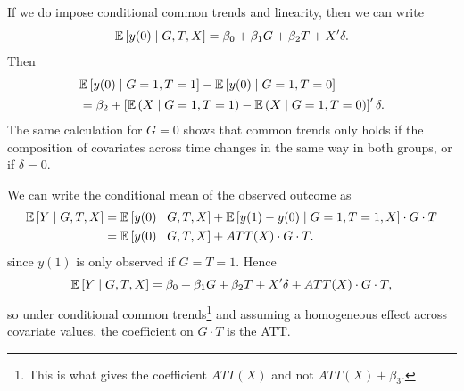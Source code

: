 \begin{remark}
	If we do impose conditional common trends and linearity, then we can write
	\[
		\mathbb{E}\left[y(0) \mid G, T, X\right] = \beta_0 + \beta_1 G + \beta_2 T + X'\delta
	.\]
	Then
	\begin{align*}
		& \mathbb{E}\left[y(0) \mid G=1, T=1\right] - \mathbb{E}\left[y(0) \mid G=1, T=0\right]\\
		&= \beta_2 + \left[\mathbb{E}\left(X \mid G=1, T=1\right) - \mathbb{E}\left(X \mid G=1, T=0\right)\right]'\delta
	.\end{align*}
	The same calculation for $G=0$ shows that common trends only holds if the composition of covariates across time changes in the same way in both groups, or if $\delta=0$.

\end{remark}

We can write the conditional mean of the observed outcome as 
\begin{align*}
	\mathbb{E}\left[Y \mid G, T, X\right]
	&= \mathbb{E}\left[y(0) \mid G, T, X\right] + \mathbb{E}\left[y(1)-y(0) \mid G=1, T=1, X\right]\cdot G \cdot T \\
	&= \mathbb{E}\left[y(0) \mid G, T, X\right] + ATT(X)\cdot G \cdot T
.\end{align*}
since $y(1)$ is only observed if $G=T=1$. Hence
\[
	\mathbb{E}\left[Y \mid G, T, X\right] = \beta_0 + \beta_1 G + \beta_2 T + X'\delta + ATT(X)\cdot G \cdot T
,\]
so under conditional common trends\footnote{This is what gives the coefficient $ATT(X)$ and not $ATT(X) + \beta_3$.} and assuming a homogeneous effect across covariate values, the coefficient on $G \cdot T$ is the ATT.

